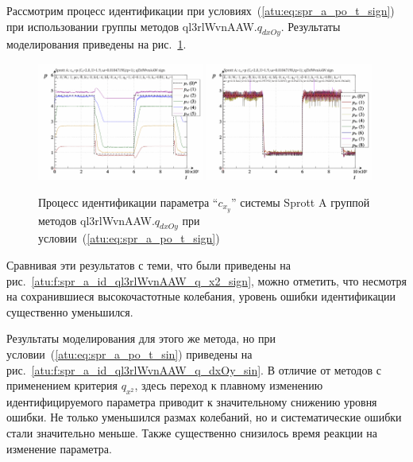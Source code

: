 Рассмотрим процесс идентификации при условиях~(\ref{atu:eq:spr_a_po_t_sign})
при использовании группы методов ql3rlWvnAAW.$q_{dxOy}$.
Результаты моделирования приведены на рис.~\ref{atu:f:spr_a_id_ql3rlWvnAAW_q_dxOy_sign}.

\begin{figure}[htb!]
  \centerline{
    \includegraphics[width=0.49\textwidth]{p/cha/spr_a/ql3rlWvnAAW_dxOy/sprott_a_id2-p_t_pi_ql3rlWvnAAW_sign.png}
    \hfill
    \includegraphics[width=0.49\textwidth]{p/cha/spr_a/ql3rlWvnAAW_dxOy/sprott_a_id2-p_t_p_ql3rlWvnAAW_sign.png}
  }
  \caption{Процесс идентификации параметра ``$c_{x_y}$'' системы Sprott A группой методов ql3rlWvnAAW.$q_{dxOy}$ при условии~(\ref{atu:eq:spr_a_po_t_sign})}
  \label{atu:f:spr_a_id_ql3rlWvnAAW_q_dxOy_sign}
\end{figure}

Сравнивая эти результатов с теми, что были приведены на рис.~\ref{atu:f:spr_a_id_ql3rlWvnAAW_q_x2_sign},
можно отметить, что несмотря на сохранившиеся высокочастотные колебания,
уровень ошибки идентификации существенно уменьшился.

Результаты моделирования для этого же метода,
но при условии~(\ref{atu:eq:spr_a_po_t_sin}) приведены на рис.~\ref{atu:f:spr_a_id_ql3rlWvnAAW_q_dxOy_sin}.
В отличие от методов с применением критерия $q_{x^2}$,
здесь переход к плавному изменению идентифицируемого параметра приводит
к значительному снижению уровня ошибки. Не только
уменьшился размах колебаний, но и систематические ошибки стали значительно меньше.
Также существенно снизилось время реакции на изменение параметра.


